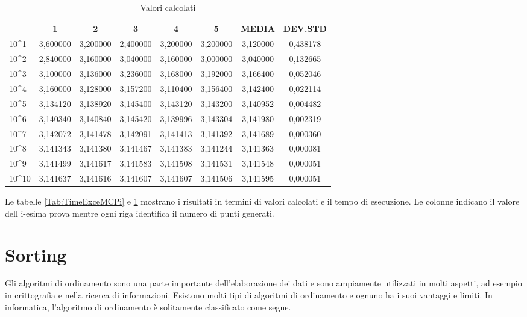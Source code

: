\documentclass[12pt,a4paper]{report}
\begin{document}
\begin{table}[h]
\begin{tabular}{|l|c|c|c|c|c|c|c|}
\hline
               & 1        & 2        & 3        & 4        & 5        & MEDIA    & DEV.STD  \\ \hline
10\textasciicircum{}1  & 3,600000 & 3,200000 & 2,400000 & 3,200000 & 3,200000 & 3,120000 & 0,438178 \\ \hline
10\textasciicircum{}2  & 2,840000 & 3,160000 & 3,040000 & 3,160000 & 3,000000 & 3,040000 & 0,132665 \\ \hline
10\textasciicircum{}3  & 3,100000 & 3,136000 & 3,236000 & 3,168000 & 3,192000 & 3,166400 & 0,052046 \\ \hline
10\textasciicircum{}4  & 3,160000 & 3,128000 & 3,157200 & 3,110400 & 3,156400 & 3,142400 & 0,022114 \\ \hline
10\textasciicircum{}5  & 3,134120 & 3,138920 & 3,145400 & 3,143120 & 3,143200 & 3,140952 & 0,004482 \\ \hline
10\textasciicircum{}6  & 3,140340 & 3,140840 & 3,145420 & 3,139996 & 3,143304 & 3,141980 & 0,002319 \\ \hline
10\textasciicircum{}7  & 3,142072 & 3,141478 & 3,142091 & 3,141413 & 3,141392 & 3,141689 & 0,000360 \\ \hline
10\textasciicircum{}8  & 3,141343 & 3,141380 & 3,141467 & 3,141383 & 3,141244 & 3,141363 & 0,000081 \\ \hline
10\textasciicircum{}9  & 3,141499 & 3,141617 & 3,141583 & 3,141508 & 3,141531 & 3,141548 & 0,000051 \\ \hline
10\textasciicircum{}10 & 3,141637 & 3,141616 & 3,141607 & 3,141607 & 3,141506 & 3,141595 & 0,000051 \\ \hline
\end{tabular}
\caption{Valori calcolati}
\label{Tab:ValueMCPi}
\end{table}

Le tabelle \ref{Tab:TimeExceMCPi} e \ref{Tab:ValueMCPi} mostrano i risultati in termini di valori calcolati e il tempo di esecuzione.  Le colonne indicano il valore dell i-esima prova mentre ogni riga identifica il numero di punti generati.

\section{Sorting}
Gli algoritmi di ordinamento sono una parte importante dell'elaborazione dei dati e sono ampiamente utilizzati in molti aspetti, ad esempio in crittografia e nella ricerca di informazioni. Esistono molti tipi di algoritmi di ordinamento e ognuno ha i suoi vantaggi e limiti. In informatica, l'algoritmo di ordinamento è solitamente classificato come segue.
\end{document}
